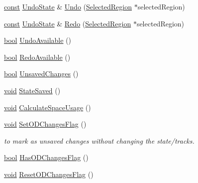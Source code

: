 \begin{DoxyCompactItemize}
\item 
\hyperlink{getopt1_8c_a2c212835823e3c54a8ab6d95c652660e}{const} \hyperlink{struct_undo_state}{Undo\+State} \& \hyperlink{class_undo_manager_acdba22654992e3e3d45480271b12da0d}{Undo} (\hyperlink{class_selected_region}{Selected\+Region} $\ast$selected\+Region)
\item 
\hyperlink{getopt1_8c_a2c212835823e3c54a8ab6d95c652660e}{const} \hyperlink{struct_undo_state}{Undo\+State} \& \hyperlink{class_undo_manager_a2ab589861f558e63f68bc1c6ca852b13}{Redo} (\hyperlink{class_selected_region}{Selected\+Region} $\ast$selected\+Region)
\item 
\hyperlink{mac_2config_2i386_2lib-src_2libsoxr_2soxr-config_8h_abb452686968e48b67397da5f97445f5b}{bool} \hyperlink{class_undo_manager_af937831972fcbd12117ce596c4da9abf}{Undo\+Available} ()
\item 
\hyperlink{mac_2config_2i386_2lib-src_2libsoxr_2soxr-config_8h_abb452686968e48b67397da5f97445f5b}{bool} \hyperlink{class_undo_manager_a062a0d5feec269a2a242148fa11b20e6}{Redo\+Available} ()
\item 
\hyperlink{mac_2config_2i386_2lib-src_2libsoxr_2soxr-config_8h_abb452686968e48b67397da5f97445f5b}{bool} \hyperlink{class_undo_manager_aacf4d5afbef28989592f8358075abfdc}{Unsaved\+Changes} ()
\item 
\hyperlink{sound_8c_ae35f5844602719cf66324f4de2a658b3}{void} \hyperlink{class_undo_manager_ae5acc46a04d7ec70517870d0da36f1c7}{State\+Saved} ()
\item 
\hyperlink{sound_8c_ae35f5844602719cf66324f4de2a658b3}{void} \hyperlink{class_undo_manager_abd358c07724f90aee10e6683e5ce5b1e}{Calculate\+Space\+Usage} ()
\item 
\hyperlink{sound_8c_ae35f5844602719cf66324f4de2a658b3}{void} \hyperlink{class_undo_manager_a01df623fc58f4291e100e00472a4ffa9}{Set\+O\+D\+Changes\+Flag} ()
\begin{DoxyCompactList}\small\item\em to mark as unsaved changes without changing the state/tracks. \end{DoxyCompactList}\item 
\hyperlink{mac_2config_2i386_2lib-src_2libsoxr_2soxr-config_8h_abb452686968e48b67397da5f97445f5b}{bool} \hyperlink{class_undo_manager_a8dc79ebdc4a98ce7834460ca5f71ae72}{Has\+O\+D\+Changes\+Flag} ()
\item 
\hyperlink{sound_8c_ae35f5844602719cf66324f4de2a658b3}{void} \hyperlink{class_undo_manager_a9df77e88702c150c352b68c00139d0d5}{Reset\+O\+D\+Changes\+Flag} ()
\end{DoxyCompactItemize}


